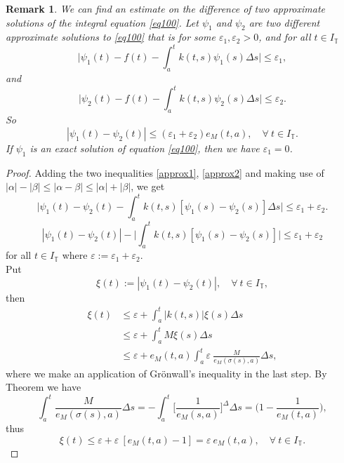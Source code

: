 \documentclass{article}
\newtheorem{rem}[thm]{Remark}
\newcommand{\q}{\quad}
\begin{document}
\begin{rem}
We can find an estimate on the difference of two approximate solutions of the integral equation \eqref{eq100}. Let $\psi_1$ and $\psi_2$ are two different approximate solutions to \eqref{eq100} that is for some $\varepsilon_1,\varepsilon_2>0$, and for all $t\in I_\mathbb{T}$
\begin{equation}\label{approx1}
 \Big|\psi_1(t)-f(t)-\int_a^tk(t,s)\psi_1(s)\Delta s\Big|\leq \varepsilon_1,
\end{equation}
 and
\begin{equation}\label{approx2}
  \Big|\psi_2(t)-f(t)-\int_a^tk(t,s)\psi_2(s)\Delta s\Big|\leq \varepsilon_2.
\end{equation}
So
$$
|\psi_1(t)-\psi_2(t)|\leq(\varepsilon_1+\varepsilon_2)e_M(t,a), \q \forall \ t \in I_\mathbb{T}.
$$
If $\psi_1$ is an exact solution of equation \eqref{eq100}, then we have $\varepsilon_1=0$.
\end{rem}
\begin{proof}
Adding the two inequalities \eqref{approx1}, \eqref{approx2} and making use of $|\alpha|-|\beta|\leq|\alpha-\beta|\leq |\alpha|+|\beta|$, we get
$$
\Big|\psi_1(t)-\psi_2(t)-\int_a^tk(t,s)[\psi_1(s)-\psi_2(s)]\Delta s\Big|\leq \varepsilon_1+\varepsilon_2.
$$
$$
|\psi_1(t)-\psi_2(t)|-\Big|\int_a^tk(t,s)[\psi_1(s)-\psi_2(s)]\Big|\leq \varepsilon_1+\varepsilon_2
$$
for all $t\in I_\mathbb{T}$ where $\varepsilon:=\varepsilon_1+\varepsilon_2$.\\
Put
$$
\xi(t):=|\psi_1(t)-\psi_2(t)|, \q \forall \ t\in I_\mathbb{T},
$$
then
 \begin{align*}
   \xi(t) &\leq \varepsilon+\int_a^t|k(t,s)|\xi(s)\Delta s \\
        &\leq \varepsilon+\int_a^tM\xi(s)\Delta s\\
        &\leq \varepsilon+e_M(t,a)\int_a^t\varepsilon \ \frac{M}{e_M(\sigma(s),a)}\Delta s,
 \end{align*}
where we make an application of Gr\"{o}nwall's inequality in the last step. By Theorem we have
$$
\int_a^t\frac{M}{e_M(\sigma(s),a)}\Delta s=-\int_a^t\Big[\frac{1}{e_M(s,a)}\Big]^{\Delta} \Delta s=\Big(1-\frac{1}{e_M(t,a)}\Big),
$$
thus
$$
\xi(t)\leq\varepsilon+\varepsilon \ [e_M(t,a)-1]=\varepsilon \ e_M(t,a),\q \forall \ t\in I_\mathbb{T}.
$$
\end{proof}
\end{document}
